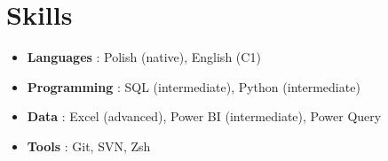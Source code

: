 \documentclass[10pt, letterpaper]{article}
\begin{document}
    \vspace{0.15 cm}
    


    
    \section{Skills}


    \begin{itemize}
        
        \item \textbf{Languages }: Polish (native), English (C1) 
        
      
        
        \item \textbf{Programming }: SQL (intermediate), Python (intermediate) 
        
      
        
        \item \textbf{Data }: Excel (advanced), Power BI (intermediate), Power Query 
        
      
        
        \item \textbf{Tools }: Git, SVN, Zsh 
        
      \end{itemize}


    
\end{document}
